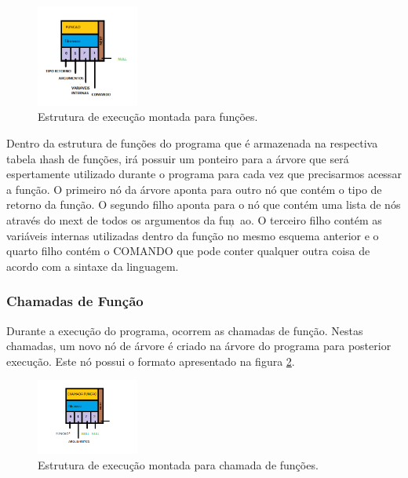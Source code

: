 \documentclass[a4paper,12pt]{report}
\begin{document}
\begin{figure}
\centering
\includegraphics[width=0.3\textwidth]{imgs/funcao.png}
\caption{\label{fig:funcoes}Estrutura de execu\c{c}\~ao montada para fun\c{c}\~oes.}
\end{figure}

Dentro da estrutura de fun\c{c}\~oes do programa que \'e armazenada na respectiva tabela \i{hash} de fun\c{c}\~oes, ir\'a possuir um ponteiro para a \'arvore que ser\'a espertamente utilizado durante o programa para cada vez que precisarmos acessar a fun\c{c}\~ao.
O primeiro n\'o da \'arvore aponta para outro n\'o que cont\'em o tipo de retorno da fun\c{c}\~ao. O segundo filho aponta para o n\'o que cont\'em uma lista de n\'os atrav\'es do \i{next} de todos os argumentos da fun\c~ao. O terceiro filho cont\'em as vari\'aveis internas utilizadas dentro da fun\c{c}\~ao no mesmo esquema anterior e o quarto filho cont\'em o COMANDO que pode conter qualquer outra coisa de acordo com a sintaxe da linguagem.


\subsubsection{Chamadas de Fun\c{c}\~ao}

Durante a execu\c{c}\~ao do programa, ocorrem as chamadas de fun\c{c}\~ao. Nestas chamadas, um novo n\'o de \'arvore \'e criado na \'arvore do programa para posterior execu\c{c}\~ao. Este n\'o possui o formato apresentado na figura \ref{fig:chamadafuncao}.

\begin{figure}
\centering
\includegraphics[width=0.3\textwidth]{imgs/chamada_funcao.png}
\caption{\label{fig:chamadafuncao}Estrutura de execu\c{c}\~ao montada para chamada de fun\c{c}\~oes.}
\end{figure}
\end{document}
